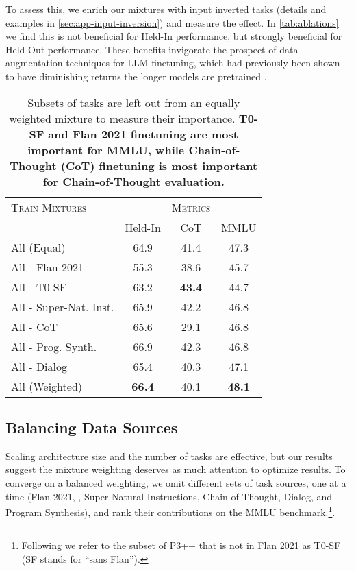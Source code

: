 To assess this, we enrich our mixtures with input inverted tasks (details and examples in \cref{sec:app-input-inversion}) and measure the effect.
In \cref{tab:ablations} we find this is not beneficial for Held-In performance, but strongly beneficial for Held-Out performance.
These benefits invigorate the prospect of data augmentation techniques for LLM finetuning, which had previously been shown to have diminishing returns the longer models are pretrained \citep{longpre2020effective}.

\begin{table}[ht]
    \centering
    \begin{tabular}{l | ccc}
    \toprule
    \textsc{Train Mixtures} &  & \textsc{Metrics} & \\
    & Held-In & CoT & MMLU \\
    \midrule
    All (Equal) & 64.9 & 41.4 & 47.3 \\
    \midrule
    All - Flan 2021 & 55.3 & 38.6 & 45.7 \\
    All - T0-SF & 63.2 & \textbf{43.4} & 44.7 \\
    All - Super-Nat. Inst. & 65.9 & 42.2 & 46.8 \\
    All - CoT & 65.6 & 29.1 & 46.8 \\
    All - Prog. Synth. & 66.9 & 42.3 & 46.8  \\
    All - Dialog & 65.4 & 40.3 & 47.1 \\
    \midrule
    All (Weighted) & \textbf{66.4} & 40.1 & \textbf{48.1} \\
    \bottomrule
    \end{tabular}
    \caption{
    Subsets of tasks are left out from an equally weighted mixture to measure their importance.
    \textbf{T0-SF and Flan 2021 finetuning are most important for MMLU, while Chain-of-Thought (CoT) finetuning is most important for Chain-of-Thought evaluation.}}
    \label{tab:mixture-ranking}
\end{table}

\subsection{Balancing Data Sources}
\label{sec:mtft-mix-balance}

Scaling architecture size and the number of tasks are effective, but our results suggest the mixture weighting deserves as much attention to optimize results. 
To converge on a balanced weighting, we omit different sets of task sources, one at a time (Flan 2021, \tzeromixture{}, Super-Natural Instructions, Chain-of-Thought, Dialog, and Program Synthesis), and rank their contributions on the MMLU benchmark.\footnote{Following \citet{chung2022scaling} we refer to the subset of P3++ that is not in Flan 2021 as T0-SF (SF stands for “sans Flan”).}.

